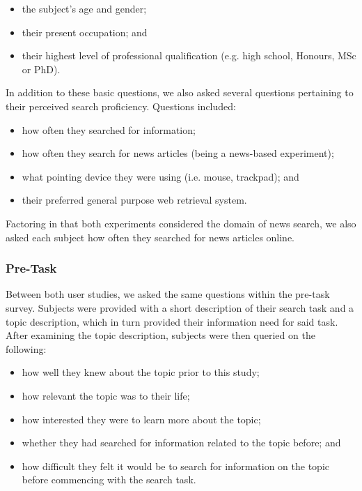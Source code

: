 \begin{itemize}
    \item{the subject's age and gender;}
    \item{their present occupation; and}
    \item{their highest level of professional qualification (e.g. high school, Honours, MSc or PhD).}
\end{itemize}

In addition to these basic questions, we also asked several questions pertaining to their perceived search proficiency. Questions included:

\begin{itemize}
    \item{how often they searched for information;}
    \item{how often they search for news articles (being a news-based experiment);}
    \item{what pointing device they were using (i.e. mouse, trackpad); and}
    \item{their preferred general purpose web retrieval system.}
\end{itemize}

Factoring in that both experiments considered the domain of news search, we also asked each subject how often they searched for news articles online.

\subsubsection{Pre-Task}
Between both user studies, we asked the same questions within the pre-task survey. Subjects were provided with a short description of their search task and a topic description, which in turn provided their information need for said task. After examining the topic description, subjects were then queried on the following:

\begin{itemize}
    \item{how well they knew about the topic prior to this study;}
    \item{how relevant the topic was to their life;}
    \item{how interested they were to learn more about the topic;}
    \item{whether they had searched for information related to the topic before; and}
    \item{how difficult they felt it would be to search for information on the topic before commencing with the search task.}
\end{itemize}

